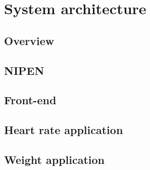 \chapter{System architecture}
\label{ch:architecture}


\section{Overview}
\section{NIPEN}
\section{Front-end}
\section{Heart rate application}
\section{Weight application}
